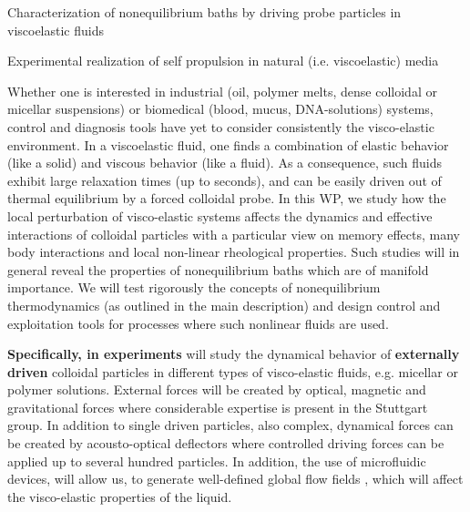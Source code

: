 \begin{workpackage}[id=WPbrown,wphases=0-48,
  short=Brown. particles, %
  title=Brownian particles in nonequilibrium baths, %
  lead=USTUTT,
  USTUTTRM=96,KULRM=6,ULEIRM=6,UNIPDRM=6]

\newrefsection

\begin{wpobjectives}
\begin{compactitem}
\item Characterization of nonequilibrium baths by driving probe particles in viscoelastic fluids
\item Experimental realization of self propulsion in natural (i.e. viscoelastic) media
  \end{compactitem}
\end{wpobjectives}

\begin{wpdescription}

Whether one is interested in industrial (oil, polymer melts, dense colloidal or micellar
suspensions) or biomedical (blood, mucus, DNA-solutions) systems, control and diagnosis
tools have yet to consider consistently the visco-elastic environment.
%
In a viscoelastic fluid, one finds a combination of elastic behavior (like a solid) and
viscous behavior (like a fluid).
%
As a consequence, such fluids exhibit large relaxation times (up to seconds), and can be
easily driven out of thermal equilibrium by a forced colloidal probe.
%
In this WP, we study how the local perturbation of visco-elastic systems affects the
dynamics and effective interactions of colloidal particles with a particular view on memory
effects, many body interactions and local non-linear rheological properties. Such studies
will in general reveal the properties of nonequilibrium baths which are of manifold
importance.
%
We will test rigorously the concepts of nonequilibrium thermodynamics (as outlined in the
main description) and design control and exploitation tools for processes where such
nonlinear fluids are used.

{\bf Specifically, in experiments} will study the dynamical behavior of {\bf externally driven} colloidal particles in different types of visco-elastic
fluids, e.g. micellar or polymer solutions. External forces will be created by optical, magnetic and gravitational forces where considerable expertise is present in the Stuttgart group. In addition to single driven particles, also complex, dynamical forces can be created by acousto-optical deflectors where controlled driving forces can be applied up to several hundred particles. In addition, the use of microfluidic devices, will allow us, to generate well-defined global flow fields \cite{scholz2012}, which will affect the visco-elastic properties of the liquid.


\end{wpdescription}
\end{workpackage}
